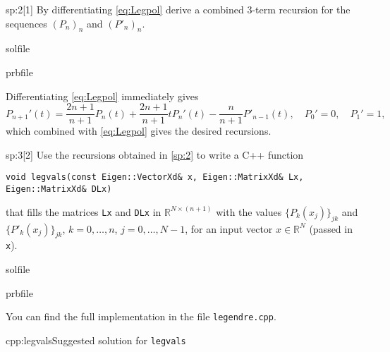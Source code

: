 \begin{samproblem}
\begin{subproblem}{sp:2}[1]
By differentiating \cref{eq:Legpol} derive a combined 3-term recursion for the sequences $(P_n)_n$ and $(P'_n)_n$.
  \begin{samwriteprbpart}{solfile}
    \begin{writeverbatim}{prbfile}
      \begin{samsolution}
        Differentiating \cref{eq:Legpol} immediately gives
        \begin{equation*}
          P_{n+1}'(t)=\frac{2n+1}{n+1}P_n(t) + \frac{2n+1}{n+1} t P_n'(t)-\frac{n}{n+1}P'_{n-1}(t),\quad P_0'=0,\quad P_1'=1,
        \end{equation*}
        which combined with \cref{eq:Legpol} gives the desired recursions.
     \end{samsolution}
    \end{writeverbatim}
  \end{samwriteprbpart}

\end{subproblem}

\begin{subproblem}{sp:3}[2]
  Use the recursions obtained in \ref{sp:2} to write a C++ function
  \begin{lstlisting}[style=cpp]
void legvals(const Eigen::VectorXd& x, Eigen::MatrixXd& Lx, Eigen::MatrixXd& DLx)
  \end{lstlisting}
  that fills the matrices \texttt{Lx} and \texttt{DLx} in $\mathbb{R}^{N\times (n+1)}$ with the values $\{P_k(x_j)\}_{jk}$ and 
  $\{P'_k(x_j)\}_{jk}$, $k=0,\dots,n$, $j=0,\dots,N-1$, for an input vector $x\in \mathbb{R}^N$ (passed in \texttt{x}).
  \begin{samwriteprbpart}{solfile}
    \begin{writeverbatim}{prbfile}
      \begin{samsolution}
        You can find the full implementation in the file \texttt{legendre.cpp}.
        \begin{samcode}[C++-code]{cpp:legvals}{Suggested solution for \texttt{legvals}}
        \end{samcode}
      \end{samsolution}
    \end{writeverbatim}
  \end{samwriteprbpart}


\end{subproblem}
\end{samproblem}
